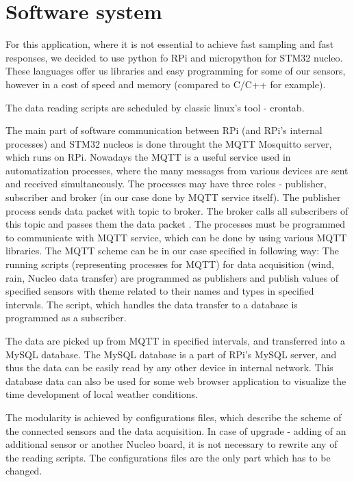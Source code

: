 
\section{Software system}
For this application, where it is not essential to achieve fast sampling and fast responses, we decided to use python fo RPi and micropython for STM32 nucleo. These languages offer us libraries and easy programming for some of our sensors, however in a cost of speed and memory (compared to C/C++ for example).
\par
The data reading scripts are scheduled by classic linux's tool - crontab.


\par
The main part of software communication between RPi (and RPi's internal processes) and STM32 nucleos is done throught the MQTT Mosquitto server, which runs on RPi. Nowadays the MQTT is a useful service used in automatization processes, where the many messages from various devices are sent and received simultaneously. The processes may have three roles - publisher, subscriber and broker (in our case done by MQTT service itself). The publisher process sends data packet with topic to broker. The broker calls all subscribers of this topic and passes them the data packet \cite{MqttServ}. The processes must be programmed to communicate with MQTT service, which can be done by using various MQTT libraries. The MQTT scheme can be in our case specified in following way: The running scripts (representing processes for MQTT) for data acquisition (wind, rain, Nucleo data transfer) are programmed as publishers and publish values of specified sensors with theme related to their names and types in specified intervals. The script, which handles the data transfer to a database is programmed as a subscriber.


\par
The data are picked up from MQTT in specified intervals, and transferred into a MySQL database. The MySQL database is a part of RPi's MySQL server, and thus the data can be easily read by any other device in internal network. This database data can also be used for some web browser application to visualize the time development of local weather conditions.

\par
The modularity is achieved by configurations files, which describe the scheme of the connected sensors and the data acquisition. In case of upgrade - adding of an additional sensor or another Nucleo board, it is not necessary to rewrite any of the reading scripts. The configurations files are the only part which has to be changed.


